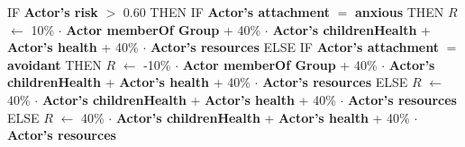 \documentclass{article}%
\begin{document}
%
\begin{flushleft}%
IF %
\textbf{Actor's risk}%
$>$%
0.60%
\linebreak%
\hspace*{2em}%
THEN %
IF %
\textbf{Actor's attachment}%
$=$%
\textbf{anxious}%
\linebreak%
\hspace*{4em}%
THEN %
$R$%
$\leftarrow$%
10\%%
$\cdot$%
\textbf{Actor memberOf Group}%
+%
40\%%
$\cdot$%
\textbf{Actor's childrenHealth}%
+%
\textbf{Actor's health}%
+%
40\%%
$\cdot$%
\textbf{Actor's resources}%
\linebreak%
\hspace*{4em}%
ELSE %
IF %
\textbf{Actor's attachment}%
$=$%
\textbf{avoidant}%
\linebreak%
\hspace*{6em}%
THEN %
$R$%
$\leftarrow$%
{-}10\%%
$\cdot$%
\textbf{Actor memberOf Group}%
+%
40\%%
$\cdot$%
\textbf{Actor's childrenHealth}%
+%
\textbf{Actor's health}%
+%
40\%%
$\cdot$%
\textbf{Actor's resources}%
\linebreak%
\hspace*{6em}%
ELSE %
$R$%
$\leftarrow$%
40\%%
$\cdot$%
\textbf{Actor's childrenHealth}%
+%
\textbf{Actor's health}%
+%
40\%%
$\cdot$%
\textbf{Actor's resources}%
\linebreak%
\hspace*{2em}%
ELSE %
$R$%
$\leftarrow$%
40\%%
$\cdot$%
\textbf{Actor's childrenHealth}%
+%
\textbf{Actor's health}%
+%
40\%%
$\cdot$%
\textbf{Actor's resources}%
\end{flushleft}

%
\end{document}
